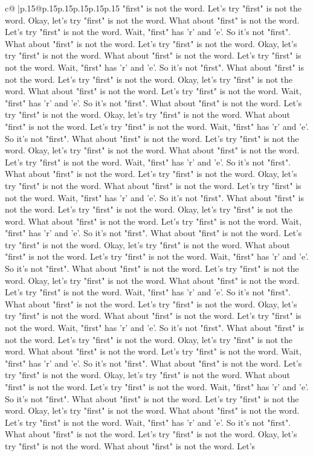 \documentclass{article}
\begin{document}
{\begin{supertabular}{c@{$\;$}|p{.15\linewidth}@{}p{.15\linewidth}p{.15\linewidth}p{.15\linewidth}p{.15\linewidth}p{.15\linewidth}}
{{{"first" is not the word. Let's try "first" is not the word. Okay, let's try "first" is not the word. What about "first" is not the word. Let's try "first" is not the word. Wait, "first" has 'r' and 'e'. So it's not "first". What about "first" is not the word. Let's try "first" is not the word. Okay, let's try "first" is not the word. What about "first" is not the word. Let's try "first" is not the word. Wait, "first" has 'r' and 'e'. So it's not "first". What about "first" is not the word. Let's try "first" is not the word. Okay, let's try "first" is not the word. What about "first" is not the word. Let's try "first" is not the word. Wait, "first" has 'r' and 'e'. So it's not "first". What about "first" is not the word. Let's try "first" is not the word. Okay, let's try "first" is not the word. What about "first" is not the word. Let's try "first" is not the word. Wait, "first" has 'r' and 'e'. So it's not "first". What about "first" is not the word. Let's try "first" is not the word. Okay, let's try "first" is not the word. What about "first" is not the word. Let's try "first" is not the word. Wait, "first" has 'r' and 'e'. So it's not "first". What about "first" is not the word. Let's try "first" is not the word. Okay, let's try "first" is not the word. What about "first" is not the word. Let's try "first" is not the word. Wait, "first" has 'r' and 'e'. So it's not "first". What about "first" is not the word. Let's try "first" is not the word. Okay, let's try "first" is not the word. What about "first" is not the word. Let's try "first" is not the word. Wait, "first" has 'r' and 'e'. So it's not "first". What about "first" is not the word. Let's try "first" is not the word. Okay, let's try "first" is not the word. What about "first" is not the word. Let's try "first" is not the word. Wait, "first" has 'r' and 'e'. So it's not "first". What about "first" is not the word. Let's try "first" is not the word. Okay, let's try "first" is not the word. What about "first" is not the word. Let's try "first" is not the word. Wait, "first" has 'r' and 'e'. So it's not "first". What about "first" is not the word. Let's try "first" is not the word. Okay, let's try "first" is not the word. What about "first" is not the word. Let's try "first" is not the word. Wait, "first" has 'r' and 'e'. So it's not "first". What about "first" is not the word. Let's try "first" is not the word. Okay, let's try "first" is not the word. What about "first" is not the word. Let's try "first" is not the word. Wait, "first" has 'r' and 'e'. So it's not "first". What about "first" is not the word. Let's try "first" is not the word. Okay, let's try "first" is not the word. What about "first" is not the word. Let's try "first" is not the word. Wait, "first" has 'r' and 'e'. So it's not "first". What about "first" is not the word. Let's try "first" is not the word. Okay, let's try "first" is not the word. What about "first" is not the word. Let's try "first" is not the word. Wait, "first" has 'r' and 'e'. So it's not "first". What about "first" is not the word. Let's try "first" is not the word. Okay, let's try "first" is not the word. What about "first" is not the word. Let's }}}
\end{supertabular}}
\end{document}
